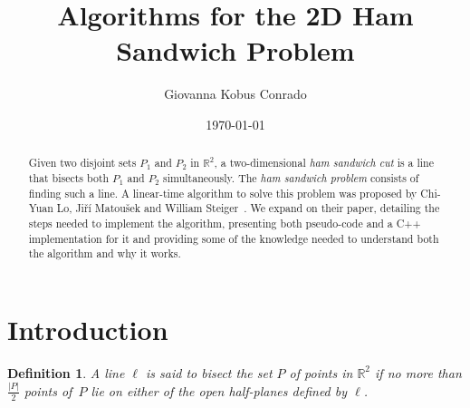 \documentclass{article}
\def\realnumbers{\mathbb{R}}
\newtheorem{definition}{Definition}
\begin{document}
\title{Algorithms for the 2D Ham Sandwich Problem}
\author{Giovanna Kobus Conrado}
\date{\today}
\maketitle


\begin{abstract}
Given two disjoint sets $P_1$ and $P_2$ in $\realnumbers^2 $, a two-dimensional \textit{ham sandwich cut} is a line that bisects both $P_1$ and $P_2$ simultaneously. The \textit{ham sandwich problem} consists of finding such a line. A linear-time algorithm to solve this problem was proposed by Chi-Yuan Lo, Ji\v{r}í Matou\v{s}ek and William Steiger~\cite{LoMS1994}. We expand on their paper, detailing the steps needed to implement the algorithm, presenting both  pseudo-code and a C++ implementation for it and providing some of the knowledge needed to understand both the algorithm and why it works.
\end{abstract}

\newpage
\section{Introduction}

\begin{definition}
\label{bisect_definition}
A line $\ell$ is said to bisect the set $P$ of points in $\realnumbers^2$ if no more than $\frac{|P|}{2}$ points of~$P$ lie on either of the open half-planes defined by $\ell$.
\end{definition}
\end{document}
